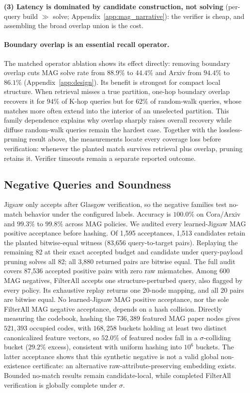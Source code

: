 \documentclass{article}
\begin{document}
\textbf{(3) Latency is dominated by candidate construction, not solving} (per-query build $\gg$ solve; Appendix~\ref{app:mag_narrative}): the verifier is cheap, and assembling the broad overlap union is the cost.

\paragraph{Boundary overlap is an essential recall operator.}
The matched operator ablation shows its effect directly: removing boundary overlap cuts MAG solve rate from $88.9\%$ to $44.4\%$ and Arxiv from $94.4\%$ to $86.1\%$ (Appendix~\ref{app:design}). Its benefit is strongest for compact local structure. When retrieval misses a true partition, one-hop boundary overlap recovers it for $94\%$ of K-hop queries but for $62\%$ of random-walk queries, whose matches more often extend into the interior of an unselected partition. This family dependence explains why overlap sharply raises overall recovery while diffuse random-walk queries remain the hardest case. Together with the lossless-pruning result above, the measurements locate every coverage loss before verification: whenever the planted match survives retrieval plus overlap, pruning retains it. Verifier timeouts remain a separate reported outcome.

\subsection{Negative Queries and Soundness}
\label{sec:soundness}

Jigsaw only accepts after Glasgow verification, so the negative families test no-match behavior under the configured labels. Accuracy is $100.0\%$ on Cora/Arxiv and $99.3\%$ to $99.8\%$ across MAG policies. We audited every learned-Jigsaw MAG positive acceptance before hashing. Of 1,595 acceptances, 1,513 candidates retain the planted bitwise-equal witness (83,656 query-to-target pairs). Replaying the remaining 82 at their exact accepted budget and candidate under query-payload pruning solves all 82; all 3,880 returned pairs are bitwise equal. The full audit covers 87,536 accepted positive pairs with zero raw mismatches. Among 600 MAG negatives, FilterAll accepts one structure-perturbed query, also flagged by every policy. Its exhaustive replay returns one 20-node mapping, and all 20 pairs are bitwise equal. No learned-Jigsaw MAG positive acceptance, nor the sole FilterAll MAG negative acceptance, depends on a hash collision. Directly measuring the codebook, hashing the $736{,}389$ featured MAG paper nodes gives $521{,}393$ occupied codes, with $168{,}258$ buckets holding at least two distinct canonicalized feature vectors, so $52.0\%$ of featured nodes fall in a $\sigma$-colliding bucket ($29.2\%$ excess), consistent with uniform hashing into $10^6$ buckets. The latter acceptance shows that this synthetic negative is not a valid global non-existence certificate: an alternative raw-attribute-preserving embedding exists. Bounded no-match results remain candidate-local, while completed FilterAll verification is globally complete under $\sigma$.
\end{document}

